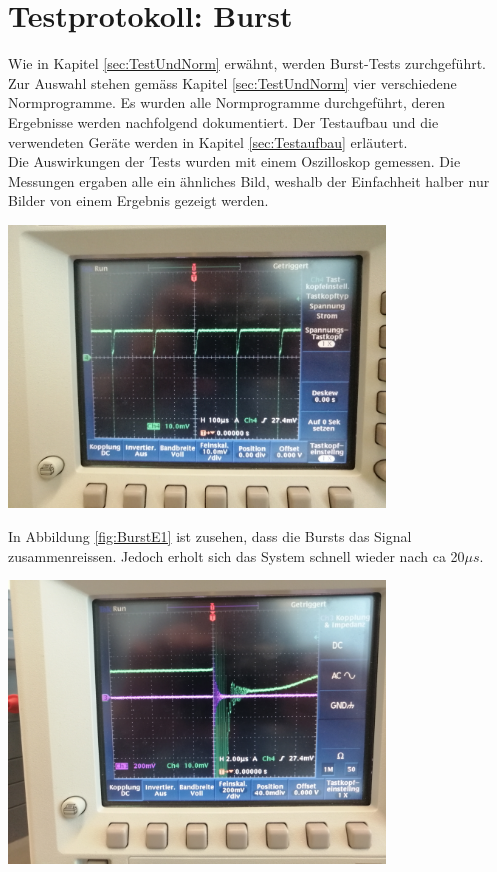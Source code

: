 \section{Testprotokoll: Burst}
\label{sec:Test:Burst}
Wie in Kapitel \ref{sec:TestUndNorm} erwähnt, werden Burst-Tests zurchgeführt. Zur Auswahl stehen gemäss Kapitel \ref{sec:TestUndNorm} vier verschiedene Normprogramme. Es wurden alle Normprogramme durchgeführt, deren Ergebnisse werden nachfolgend dokumentiert. Der Testaufbau und die verwendeten Geräte werden in Kapitel \ref{sec:Testaufbau} erläutert.\\[0.25cm]
Die Auswirkungen der Tests wurden mit einem Oszilloskop gemessen. Die Messungen ergaben alle ein ähnliches Bild, weshalb der Einfachheit halber nur Bilder von einem Ergebnis gezeigt werden.\\[0.25cm]
\begin{minipage}[b][10cm][t]{1\textwidth}
\centering
\includegraphics[angle=0,width=0.75\textwidth]{graphics/BurstE1.jpg}
\label{fig:BurstE1}
\end{minipage}
In Abbildung \ref{fig:BurstE1} ist zusehen, dass die Bursts das Signal zusammenreissen. Jedoch erholt sich das System schnell wieder nach ca 20$\mu s$.\\
[0.5cm]
\begin{minipage}[b][10cm][t]{1\textwidth}
\centering
\includegraphics[angle=0,width=0.75\textwidth]{graphics/BurstE2.jpg}
\label{fig:BurstE2}
\end{minipage}
